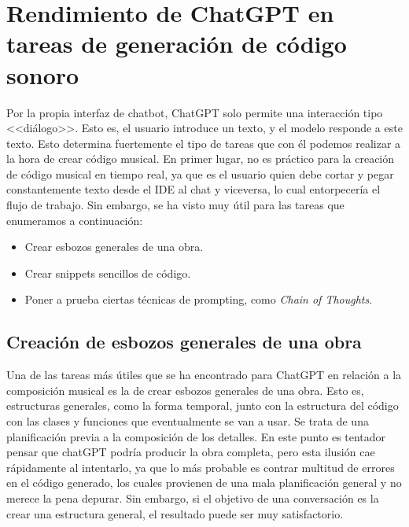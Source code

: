\section{Rendimiento de ChatGPT en tareas de generación de código sonoro}
Por la propia interfaz de chatbot, ChatGPT solo permite una interacción tipo <<diálogo>>. Esto es, el usuario introduce un texto, y el modelo responde a este texto. Esto determina fuertemente el tipo de tareas que con él podemos realizar a la hora de crear código musical. En primer lugar, no es práctico para la creación de código musical en tiempo real, ya que es el usuario quien debe cortar y pegar constantemente texto desde el IDE al chat y viceversa, lo cual entorpecería el flujo de trabajo. Sin embargo, se ha visto muy útil para las tareas que enumeramos a continuación:

\begin{itemize}
    \item Crear esbozos generales de una obra.
    \item Crear snippets sencillos de código.
    \item Poner a prueba ciertas técnicas de prompting, como \textit{Chain of Thoughts}.
\end{itemize}

\subsection{Creación de esbozos generales de una obra}
Una de las tareas más útiles que se ha encontrado para ChatGPT en relación a la composición musical es la de crear esbozos generales de una obra. Esto es, estructuras generales, como la forma temporal, junto con la estructura del código con las clases y funciones que eventualmente se van a usar. Se trata de una planificación previa a la composición de los detalles. En este punto es tentador pensar que chatGPT podría producir la obra completa, pero esta ilusión cae rápidamente al intentarlo, ya que lo  más probable es contrar multitud de errores en el código generado, los cuales provienen de una mala planificación general y no merece la pena depurar. Sin embargo, si el objetivo de una conversación es la crear una estructura general, el resultado puede ser muy satisfactorio.

